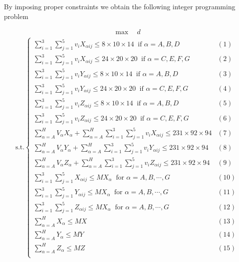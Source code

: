 \documentclass{mcmthesis}
\begin{document}
\noindent By imposing proper constraints we obtain the following integer programming problem

\[
\begin{aligned}
\max\quad d
\end{aligned}
\]
\[
\begin{aligned}
\text{s.t.}
\left\{
\begin{array}{lr}
\sum\limits_{i=1}^{3}\sum\limits_{j=1}^{5}v_{i}X_{\alpha ij}\le 8\times 10\times 14\ \text{ if }\alpha=A,B,D &(1)\\
\sum\limits_{i=1}^{3}\sum\limits_{j=1}^{5}v_{i}X_{\alpha ij}\le 24\times 20\times 20\ \text{ if }\alpha=C,E,F,G &(2)\\
\sum\limits_{i=1}^{3}\sum\limits_{j=1}^{5}v_{i}Y_{\alpha ij}\le 8\times 10\times 14\ \text{ if }\alpha=A,B,D &(3)\\
\sum\limits_{i=1}^{3}\sum\limits_{j=1}^{5}v_{i}Y_{\alpha ij}\le 24\times 20\times 20\ \text{ if }\alpha=C,E,F,G &(4)\\
\sum\limits_{i=1}^{3}\sum\limits_{j=1}^{5}v_{i}Z_{\alpha ij}\le 8\times 10\times 14\ \text{ if }\alpha=A,B,D &(5)\\
\sum\limits_{i=1}^{3}\sum\limits_{j=1}^{5}v_{i}Z_{\alpha ij}\le 24\times 20\times 20\ \text{ if }\alpha=C,E,F,G &(6)\\
\sum\limits_{\alpha=A}^{H}V_{\alpha}X_{\alpha}+\sum\limits_{\alpha=A}^{H}\sum\limits_{i=1}^{3}\sum\limits_{j=1}^{5}v_{i}X_{\alpha ij}\le 231\times92\times 94&(7)\\
\sum\limits_{\alpha=A}^{H}V_{\alpha}Y_{\alpha}+\sum\limits_{\alpha=A}^{H}\sum\limits_{i=1}^{3}\sum\limits_{j=1}^{5}v_{i}Y_{\alpha ij}\le 231\times92\times 94&(8)\\
\sum\limits_{\alpha=A}^{H}V_{\alpha}Z_{\alpha}+\sum\limits_{\alpha=A}^{H}\sum\limits_{i=1}^{3}\sum\limits_{j=1}^{5}v_{i}Z_{\alpha ij}\le 231\times92\times 94&(9)\\
\sum\limits_{i=1}^{3}\sum\limits_{j=1}^{5}X_{\alpha ij}\le M X_{\alpha}\ \text{ for }\alpha=A,B,\cdots, G&(10)\\
\sum\limits_{i=1}^{3}\sum\limits_{j=1}^{5}Y_{\alpha ij}\le M X_{\alpha}\ \text{ for }\alpha=A,B,\cdots, G&(11)\\
\sum\limits_{i=1}^{3}\sum\limits_{j=1}^{5}Z_{\alpha ij}\le M X_{\alpha}\ \text{ for }\alpha=A,B,\cdots, G&(12)\\
\sum\limits_{\alpha=A}^{H}X_\alpha\le MX&(13)\\
\sum\limits_{\alpha=A}^{H}Y_\alpha\le MY&(14)\\
\sum\limits_{\alpha=A}^{H}Z_\alpha\le MZ&(15)\\

\end{array}
\end{aligned}\]
\end{document}

